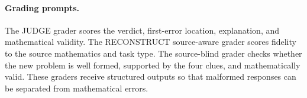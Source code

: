 \documentclass[11pt]{article}
\begin{document}
\paragraph{Grading prompts.}
The JUDGE grader scores the verdict, first-error location, explanation, and mathematical validity. The RECONSTRUCT source-aware grader scores fidelity to the source mathematics and task type. The source-blind grader checks whether the new problem is well formed, supported by the four clues, and mathematically valid. These graders receive structured outputs so that malformed responses can be separated from mathematical errors.
\end{document}
